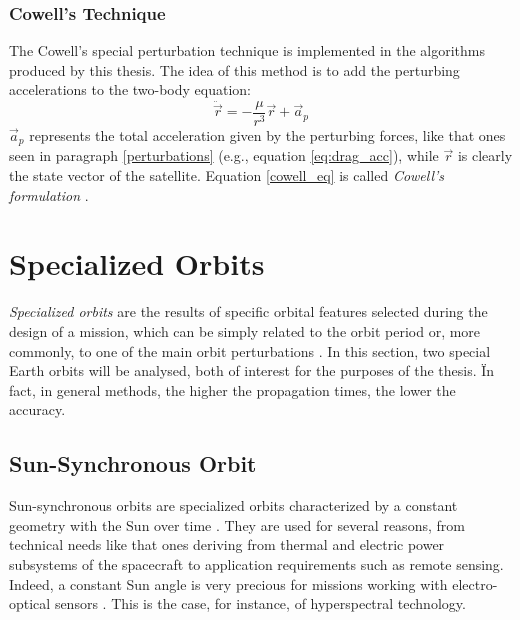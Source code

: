 \subsubsection{Cowell's Technique}
The Cowell's special perturbation technique is implemented in the algorithms produced by this thesis.
The idea of this method is to add the perturbing accelerations to the two-body equation:
\begin{equation} \label{cowell_eq}
    \ddot{\vec{r}} = - \frac{\mu}{r^3}\vec{r} + \vec{a}_p
\end{equation}
$\vec{a}_p$ represents the total acceleration given by the perturbing forces, like that ones seen in paragraph \ref{perturbations} (e.g., equation \ref{eq:drag_acc}), while $\vec{r}$ is clearly the state vector of the satellite.
Equation \ref{cowell_eq} is called \textit{Cowell's formulation} \cite{vallado2013fundamentals}.

\section{Specialized Orbits}
\textit{Specialized orbits} are the results of specific orbital features selected during the design of a mission, which can be simply related to the orbit period or, more commonly, to one of the main orbit perturbations \cite{wertz2009orbit}. 
In this section, two special Earth orbits will be analysed, both of interest for the purposes of the thesis.
Ïn fact, in general methods, the higher the propagation times, the lower the accuracy.

\subsection{Sun-Synchronous Orbit} \label{sso_paragraph}
Sun-synchronous orbits are specialized orbits characterized by a constant geometry with the Sun over time \cite{vallado2013fundamentals}. 
They are used for several reasons, from technical needs like that ones deriving from thermal and electric power subsystems of the spacecraft to application requirements such as remote sensing.
Indeed, a constant Sun angle is very precious for missions working with electro-optical sensors \cite{brown1998spacecraft}.
This is the case, for instance, of hyperspectral technology. 

